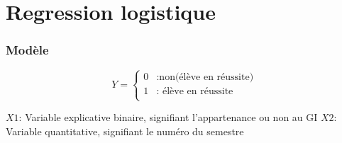\documentclass[12pt]{article}
\begin{document}
\part*{Regression logistique}
\section{Modèle}

\begin{equation}
Y=
\left\lbrace
\begin{array}{ccc}
0 & \text{:non(élève en réussite)}\\
1 & \text{: élève en réussite}\\
\end{array}\right.
\end{equation}

$X1$: Variable explicative binaire, signifiant l'appartenance ou non au GI
$X2$: Variable quantitative, signifiant le numéro du semestre
\end{document}
